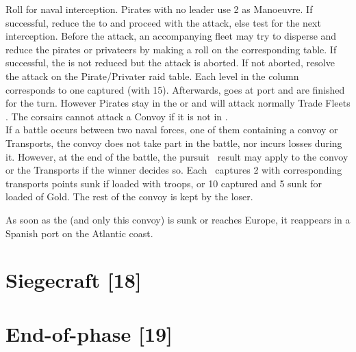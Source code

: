\bparag Roll for naval interception. Pirates with no leader use 2
as Manoeuvre.  If successful, reduce the \corsaire to \Facemoins and proceed with the attack,
else test for the next interception.
\bparag Before the attack, an accompanying fleet may try to disperse and
reduce the pirates or privateers by making a roll on the corresponding
table.  If successful, the \corsaire is not reduced but the attack is aborted.
\bparag If not aborted, resolve the attack on the  Pirate/Privater raid table.
\bparag Each level in the column \TradeFLEET\faceplus corresponds to one \NTD
captured (with 15\ducats).
\bparag Afterwards, \corsaire goes at port and are finished for the
turn. However Pirates stay in the \CTZ or \STZ and will attack normally Trade
Fleets .
\bparag The  corsairs cannot attack a Convoy if it is
not in . \\
{} If a battle occurs between two naval forces,
one of them containing a convoy or Transports, the convoy does not take
part in the battle, nor incurs losses during it.
\bparag However, at the end of the battle, the pursuit \textetoilex\
result may apply to the convoy or the Transports if the winner decides
so.
\bparag Each \textetoilex\ captures 2 \NTD with corresponding transports
points sunk if loaded with troops, or 10 \ducats captured and 5 \ducats
sunk for \NTD loaded of Gold.
\bparag The rest of the convoy is kept by the loser.

 \label{chMilitary:FlotaDeOroMovement} As soon as the
\terme{Flota de Oro} (and only this convoy) is sunk or reaches Europe, it
reappears in a Spanish port on the Atlantic coast. %

%
%

\section{Siegecraft [18]}

\section{End-of-phase [19]}

